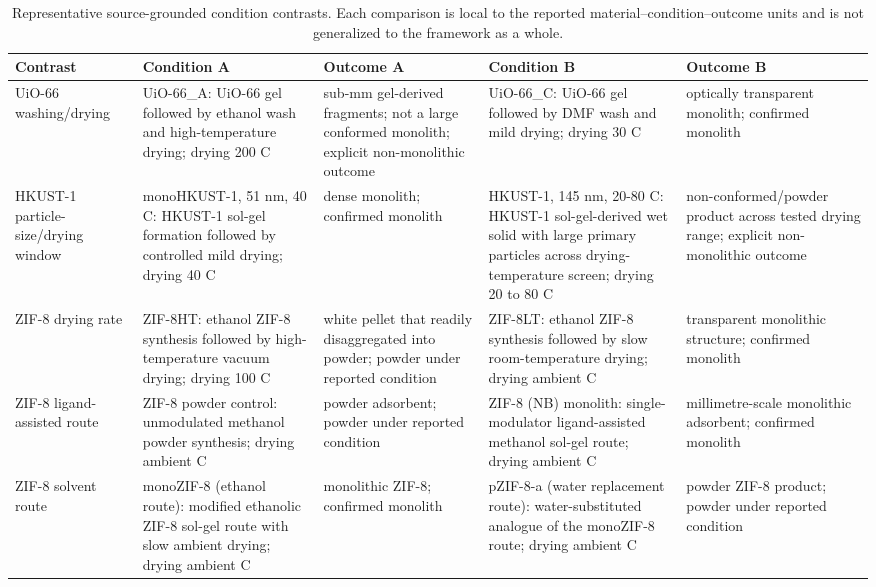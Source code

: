 \begin{table}[htbp]
\centering
\caption{Representative source-grounded condition contrasts. Each comparison is local to the reported material--condition--outcome units and is not generalized to the framework as a whole.}
\label{tab:condition-contrasts}
\footnotesize
\begin{tabular}{@{}p{2.3cm}p{3.4cm}p{2.4cm}p{3.4cm}p{2.4cm}@{}}
\toprule
Contrast & Condition A & Outcome A & Condition B & Outcome B \\
\midrule
UiO-66 washing/drying\cite{ref4} & UiO-66\_A: UiO-66 gel followed by ethanol wash and high-temperature drying; drying 200 C & sub-mm gel-derived fragments; not a large conformed monolith; explicit non-monolithic outcome & UiO-66\_C: UiO-66 gel followed by DMF wash and mild drying; drying 30 C & optically transparent monolith; confirmed monolith \\
HKUST-1 particle-size/drying window\cite{ref58} & monoHKUST-1, 51 nm, 40 C: HKUST-1 sol-gel formation followed by controlled mild drying; drying 40 C & dense monolith; confirmed monolith & HKUST-1, 145 nm, 20-80 C: HKUST-1 sol-gel-derived wet solid with large primary particles across drying-temperature screen; drying 20 to 80 C & non-conformed/powder product across tested drying range; explicit non-monolithic outcome \\
ZIF-8 drying rate\cite{ref59} & ZIF-8HT: ethanol ZIF-8 synthesis followed by high-temperature vacuum drying; drying 100 C & white pellet that readily disaggregated into powder; powder under reported condition & ZIF-8LT: ethanol ZIF-8 synthesis followed by slow room-temperature drying; drying ambient C & transparent monolithic structure; confirmed monolith \\
ZIF-8 ligand-assisted route\cite{ref60} & ZIF-8 powder control: unmodulated methanol powder synthesis; drying ambient C & powder adsorbent; powder under reported condition & ZIF-8 (NB) monolith: single-modulator ligand-assisted methanol sol-gel route; drying ambient C & millimetre-scale monolithic adsorbent; confirmed monolith \\
ZIF-8 solvent route\cite{ref62} & monoZIF-8 (ethanol route): modified ethanolic ZIF-8 sol-gel route with slow ambient drying; drying ambient C & monolithic ZIF-8; confirmed monolith & pZIF-8-a (water replacement route): water-substituted analogue of the monoZIF-8 route; drying ambient C & powder ZIF-8 product; powder under reported condition \\
\bottomrule
\end{tabular}
\end{table}
